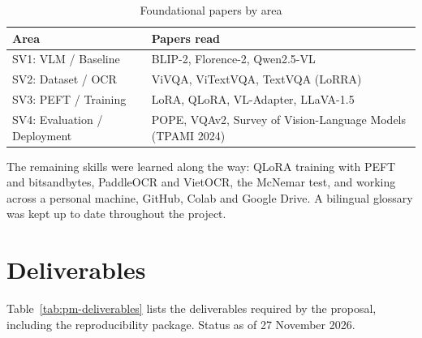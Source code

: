 \begin{table}[htbp]
\caption{Foundational papers by area}
\label{tab:pm-papers}
\centering
\small
\begin{tabular}{p{}p{}}
\toprule
\textbf{Area} & \textbf{Papers read} \\
\midrule
SV1: VLM / Baseline & BLIP-2, Florence-2, Qwen2.5-VL \\
SV2: Dataset / OCR & ViVQA, ViTextVQA, TextVQA (LoRRA) \\
SV3: PEFT / Training & LoRA, QLoRA, VL-Adapter, LLaVA-1.5 \\
SV4: Evaluation / Deployment & POPE, VQAv2, Survey of Vision-Language Models (TPAMI 2024) \\
\bottomrule
\end{tabular}
\end{table}

The remaining skills were learned along the way: QLoRA training with PEFT and bitsandbytes,
PaddleOCR and VietOCR, the McNemar test, and working across a personal machine, GitHub, Colab
and Google Drive. A bilingual glossary  was kept up to date throughout
the project.

\section{Deliverables}
\label{sec:pm-deliverables}

Table~\ref{tab:pm-deliverables} lists the deliverables required by the proposal, including the
reproducibility package. Status as of 27 November 2026.

